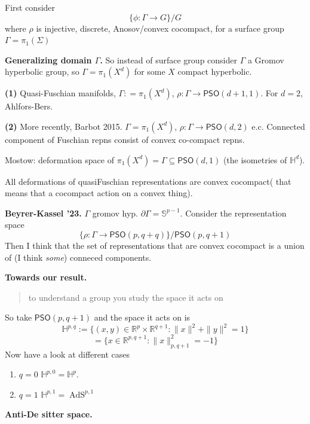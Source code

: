 First consider
$$\{\phi:\Gamma \to G\}\Big/G$$
where $\rho$ is injective, discrete,
Anosov/convex cocompact, for a surface group
$\Gamma=\pi_{1}(\Sigma)$

\medskip\noindent
{\bf Generalizing domain $\Gamma$.}
So instead of surface group consider $\Gamma$
a Gromov hyperbolic group, so
$\Gamma=\pi_{1}(X^d)$ for some $X$ compact
hyperbolic.

{\bf (1)}
Quasi-Fuschian manifolds, $\Gamma : =
\pi_{1}(X^d)$, $\rho: \Gamma \to
\mathsf{PSO}(d+1,1)$. For $d=2$,
Ahlfors-Bers.

{\bf (2)}
More recently, Barbot 2015. $\Gamma=
\pi_{1}(X^d)$, $\rho: \Gamma \to
\mathsf{PSO}(d,2)$ e.c. Connected component
of Fuschian repns consist of convex
co-compact repns.

Mostow: deformation space of $\pi_{1}(X^d) =
\Gamma \subseteq \mathsf{PSO}(d,1)$ (the
isometries of $\mathbb{H}^{d}$).

\begin{remark}
\label{remark-smith-summary-so-far}
All deformations of quasiFuschian
representations are convex cocompact( that
means that a cocompact action on a convex
thing).
\end{remark}

\medskip\noindent
{\bf Beyrer-Kassel '23.}
$\Gamma$ gromov hyp. $\partial
\Gamma=\mathbb{S}^{p-1}$. Consider the
representation space
$$\{\rho:\Gamma\to
\mathsf{PSO}(p,q+q)\}\Big/
\mathsf{PSO}(p,q+1)$$
Then I think that the set of representations
that are convex cocompact is a union of (I
think \textit{some}) conneced components.

\medskip\noindent
{\bf Towards our result.}

\begin{quotation}
to understand a group you study the space it
acts on
\end{quotation}

So take $\mathsf{PSO}(p,q+1)$ and the space
it acts on is
$$\mathbb{H}^{p,q}:=\{(x,y) \in \mathbb{R}^p
\times \mathbb{R}^{q+1}:
\|x\|^2+\|y\|^2=1\}$$
$$=\{x \in \mathbb{R}^{p,q+1}:
\|x\|^2_{p,q+1}=-1\}$$
Now have a look at different cases
\begin{enumerate}
\item $q=0$
$\mathbb{H}^{p,0}=\mathbb{H}^{p}$.
\item $q=1$
$\mathbb{H}^{p,1}=\operatorname{AdS}^{p,1}$
\end{enumerate}

\medskip\noindent
{\bf Anti-De sitter space.}

